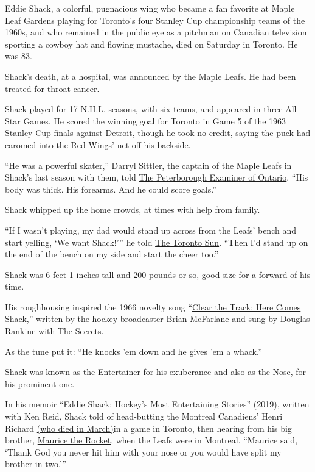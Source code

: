 Eddie Shack, a colorful, pugnacious wing who became a fan favorite at
Maple Leaf Gardens playing for Toronto's four Stanley Cup championship
teams of the 1960s, and who remained in the public eye as a pitchman on
Canadian television sporting a cowboy hat and flowing mustache, died on
Saturday in Toronto. He was 83.

Shack's death, at a hospital, was announced by the Maple Leafs. He had
been treated for throat cancer.

Shack played for 17 N.H.L. seasons, with six teams, and appeared in
three All-Star Games. He scored the winning goal for Toronto in Game 5
of the 1963 Stanley Cup finals against Detroit, though he took no
credit, saying the puck had caromed into the Red Wings' net off his
backside.

``He was a powerful skater,'' Darryl Sittler, the captain of the Maple
Leafs in Shack's last season with them, told
\href{https://www.thepeterboroughexaminer.com/ts/sports/leafs/2020/07/26/the-entertainer-eddie-shack-was-everything-leafs-fans-wanted-in-a-hockey-player.html}{The
Peterborough Examiner of Ontario}. ``His body was thick. His forearms.
And he could score goals.''

Shack whipped up the home crowds, at times with help from family.

``If I wasn't playing, my dad would stand up across from the Leafs'
bench and start yelling, `We want Shack!''' he told
\href{https://torontosun.com/sports/hockey/leafs-eddie-shack-the-entertainer-dies-at-83}{The
Toronto Sun}. ``Then I'd stand up on the end of the bench on my side and
start the cheer too.''

Shack was 6 feet 1 inches tall and 200 pounds or so, good size for a
forward of his time.

His roughhousing inspired the 1966 novelty song
``\href{https://www.youtube.com/watch?v=kb8_Ybbrn5A}{Clear the Track:
Here Comes Shack},'' written by the hockey broadcaster Brian McFarlane
and sung by Douglas Rankine with The Secrets.

As the tune put it: ``He knocks 'em down and he gives 'em a whack.''

Shack was known as the Entertainer for his exuberance and also as the
Nose, for his prominent one.

In his memoir ``Eddie Shack: Hockey's Most Entertaining Stories''
(2019), written with Ken Reid, Shack told of head-butting the Montreal
Canadiens' Henri Richard
\href{https://www.nytimes3xbfgragh.onion/2020/03/06/sports/hockey/henri-richard-dead.html}{(who
died in March)}in a game in Toronto, then hearing from his big brother,
\href{https://www.nytimes3xbfgragh.onion/2000/05/28/sports/rocket-richard-montreal-s-goal-scoring-hero-dies-at-78.html}{Maurice
the Rocket}, when the Leafs were in Montreal. ``Maurice said, `Thank God
you never hit him with your nose or you would have split my brother in
two.'''

